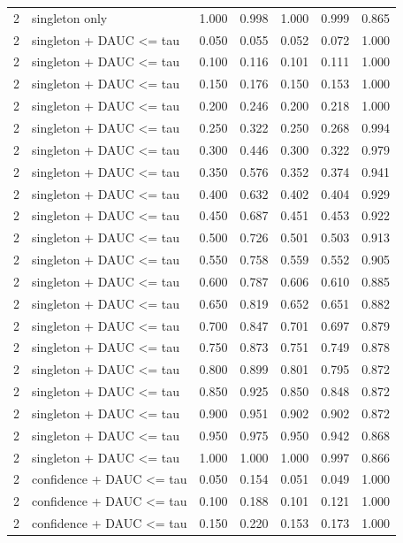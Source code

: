 \begin{tabular}{rlrrrrr}
2 & singleton only & 1.000 & 0.998 & 1.000 & 0.999 & 0.865 \\
2 & singleton + DAUC <= tau & 0.050 & 0.055 & 0.052 & 0.072 & 1.000 \\
2 & singleton + DAUC <= tau & 0.100 & 0.116 & 0.101 & 0.111 & 1.000 \\
2 & singleton + DAUC <= tau & 0.150 & 0.176 & 0.150 & 0.153 & 1.000 \\
2 & singleton + DAUC <= tau & 0.200 & 0.246 & 0.200 & 0.218 & 1.000 \\
2 & singleton + DAUC <= tau & 0.250 & 0.322 & 0.250 & 0.268 & 0.994 \\
2 & singleton + DAUC <= tau & 0.300 & 0.446 & 0.300 & 0.322 & 0.979 \\
2 & singleton + DAUC <= tau & 0.350 & 0.576 & 0.352 & 0.374 & 0.941 \\
2 & singleton + DAUC <= tau & 0.400 & 0.632 & 0.402 & 0.404 & 0.929 \\
2 & singleton + DAUC <= tau & 0.450 & 0.687 & 0.451 & 0.453 & 0.922 \\
2 & singleton + DAUC <= tau & 0.500 & 0.726 & 0.501 & 0.503 & 0.913 \\
2 & singleton + DAUC <= tau & 0.550 & 0.758 & 0.559 & 0.552 & 0.905 \\
2 & singleton + DAUC <= tau & 0.600 & 0.787 & 0.606 & 0.610 & 0.885 \\
2 & singleton + DAUC <= tau & 0.650 & 0.819 & 0.652 & 0.651 & 0.882 \\
2 & singleton + DAUC <= tau & 0.700 & 0.847 & 0.701 & 0.697 & 0.879 \\
2 & singleton + DAUC <= tau & 0.750 & 0.873 & 0.751 & 0.749 & 0.878 \\
2 & singleton + DAUC <= tau & 0.800 & 0.899 & 0.801 & 0.795 & 0.872 \\
2 & singleton + DAUC <= tau & 0.850 & 0.925 & 0.850 & 0.848 & 0.872 \\
2 & singleton + DAUC <= tau & 0.900 & 0.951 & 0.902 & 0.902 & 0.872 \\
2 & singleton + DAUC <= tau & 0.950 & 0.975 & 0.950 & 0.942 & 0.868 \\
2 & singleton + DAUC <= tau & 1.000 & 1.000 & 1.000 & 0.997 & 0.866 \\
2 & confidence + DAUC <= tau & 0.050 & 0.154 & 0.051 & 0.049 & 1.000 \\
2 & confidence + DAUC <= tau & 0.100 & 0.188 & 0.101 & 0.121 & 1.000 \\
2 & confidence + DAUC <= tau & 0.150 & 0.220 & 0.153 & 0.173 & 1.000 \\

\end{tabular}
